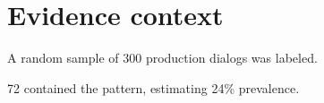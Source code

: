 \section{Evidence context}
A random sample of 300 production dialogs was labeled.

72 contained the pattern, estimating 24\% prevalence.
